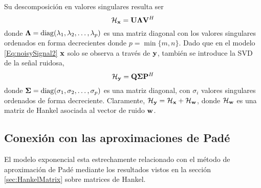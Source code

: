         Su descomposición en valores singulares resulta ser
		\begin{equation}
		      \mathcal{H}_{\mathbf{x}} = \mathbf{U}\boldsymbol{\Lambda}\mathbf{V}^H
		      \label{Eq:SVD}
		\end{equation}
		donde $\boldsymbol{\Lambda} = \mathrm{diag}(\lambda_1,\lambda_2,\ldots,\lambda_p)$ es una matriz diagonal con los valores singulares ordenados en forma decrecientes donde $p=\min\{m,n\}$. Dado que en el modelo \eqref{Eq:noisySignal2} $\mathbf{x}$ solo se observa a través de $\mathbf{y}$, también se introduce la SVD de la señal ruidosa,
		\begin{equation}
		      \mathcal{H}_{\mathbf{y}} = \mathbf{Q}\boldsymbol{\Sigma}\mathbf{P}^H
		      \label{Eq:SVD_noisy}
		\end{equation}
		donde $\boldsymbol{\Sigma} = \mathrm{diag}(\sigma_1,\sigma_2,\ldots,\sigma_p)$ es una matriz diagonal, con $\sigma_i$ valores singulares ordenados de forma decreciente. Claramente, $\mathcal{H}_{\mathbf{y}} = \mathcal{H}_{\mathbf{x}} + \mathcal{H}_{\mathbf{w}}$, donde $\mathcal{H}_{\mathbf{w}}$ es una matriz de Hankel asociada al vector de ruido $\mathbf{w}$.
	
        \subsection{Conexión con las aproximaciones de Padé}\label{sec:pade}
			
			El modelo exponencial esta estrechamente relacionado con el método de aproximación de Padé mediante los resultados vistos en la sección \eqref{sec:HankelMatrix} sobre matrices de Hankel.
			 
